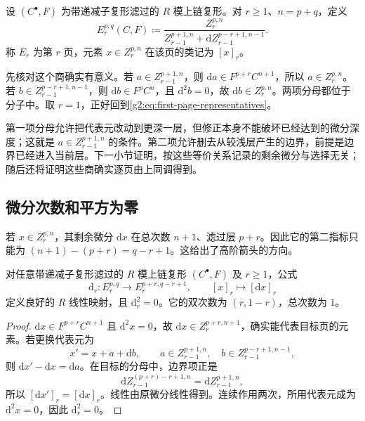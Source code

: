 \begin{definition}\label{g2:def:spectral-sequence-pages}
	设 \((C^\bullet,F)\) 为带递减子复形滤过的 \(R\) 模上链复形。对 \(r\ge1\)、\(n=p+q\)，定义
	\begin{equation}\label{g2:eq:spectral-sequence-page-quotient}
		E_r^{p,q}(C,F)\coloneqq
		\frac{Z_r^{p,n}}
		{Z_{r-1}^{p+1,n}+\mathrm d Z_{r-1}^{p-r+1,n-1}}.
	\end{equation}
	称 \(E_r\) 为第 \(r\) 页，元素 \(x\in Z_r^{p,n}\) 在该页的类记为 \([x]_r\)。
\end{definition}

先核对这个商确实有意义。若 \(a\in Z_{r-1}^{p+1,n}\)，则 \(\mathrm da\in F^{p+r}C^{n+1}\)，所以 \(a\in Z_r^{p,n}\)。若 \(b\in Z_{r-1}^{p-r+1,n-1}\)，则 \(\mathrm db\in F^pC^n\)，且 \(\mathrm d^2b=0\)，故 \(\mathrm db\in Z_r^{p,n}\)。两项分母都位于分子中。取 \(r=1\)，正好回到\eqref{g2:eq:first-page-representatives}。

\ProseParagraphBreak

第一项分母允许把代表元改动到更深一层，但修正本身不能破坏已经达到的微分深度；这就是 \(a\in Z_{r-1}^{p+1,n}\) 的条件。第二项允许删去从较浅层产生的边界，前提是边界已经进入当前层。下一小节证明，按这些等价关系记录的剩余微分与选择无关；随后还将证明这些商确实逐页由上同调得到。

\subsection{微分次数和平方为零}
\label{g2:subsec:1002:03}

若 \(x\in Z_r^{p,n}\)，其剩余微分 \(\mathrm dx\) 在总次数 \(n+1\)、滤过层 \(p+r\)。因此它的第二指标只能为 \((n+1)-(p+r)=q-r+1\)。这给出了高阶箭头的方向。

\begin{proposition}\label{g2:prop:spectral-sequence-differential}
	对任意带递减子复形滤过的 \(R\) 模上链复形 \((C^\bullet,F)\) 及 \(r\ge1\)，公式
	\begin{equation}\label{g2:eq:spectral-sequence-differential}
		\mathrm d_r:E_r^{p,q}\longrightarrow E_r^{p+r,q-r+1},\qquad
		[x]_r\longmapsto[\mathrm dx]_r
	\end{equation}
	定义良好的 \(R\) 线性映射，且 \(\mathrm d_r^2=0\)。它的双次数为 \((r,1-r)\)，总次数为 \(1\)。
\end{proposition}
\begin{proof}
	\(\mathrm dx\in F^{p+r}C^{n+1}\) 且 \(\mathrm d^2x=0\)，故 \(\mathrm dx\in Z_r^{p+r,n+1}\)，确实能代表目标页的元素。若更换代表元为
	\[
		x'=x+a+\mathrm db,\qquad
		a\in Z_{r-1}^{p+1,n},\quad b\in Z_{r-1}^{p-r+1,n-1},
	\]
	则 \(\mathrm dx'-\mathrm dx=\mathrm da\)。在目标的分母中，边界项正是
	\[
		\mathrm d Z_{r-1}^{(p+r)-r+1,n}=\mathrm d Z_{r-1}^{p+1,n},
	\]
	所以 \([\mathrm dx']_r=[\mathrm dx]_r\)。线性由原微分线性得到。连续作用两次，所用代表元成为 \(\mathrm d^2x=0\)，因此 \(\mathrm d_r^2=0\)。
\end{proof}

